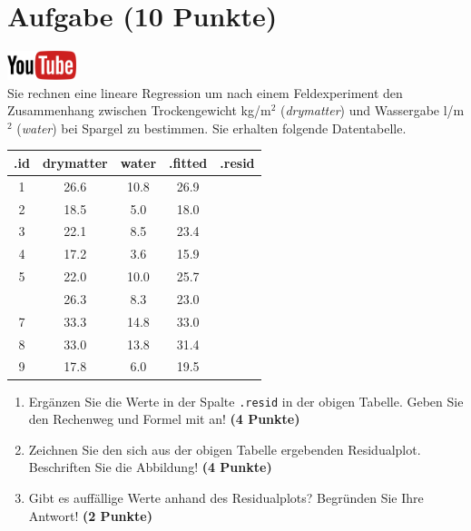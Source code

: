 \documentclass[a4paper, 10pt]{scrartcl}\usepackage[]{graphicx}\usepackage[]{xcolor}
\newenvironment{knitrout}{}{} %
\begin{document}
 
\clearpage

\section{Aufgabe \hfill (10 Punkte)}

\hfill\href{https://youtu.be/dyQlYV9nOqY}{\includegraphics[width =
  2cm]{img/youtube}}\\[1Ex]

Sie rechnen eine lineare Regression um nach einem Feldexperiment den
Zusammenhang zwischen Trockengewicht kg/m$^2$ (\textit{drymatter}) und
Wassergabe l/m$^2$ (\textit{water}) bei Spargel zu bestimmen. Sie erhalten
folgende Datentabelle.

\begin{knitrout}
\color{fgcolor}\begin{table}[!h]
\centering\begingroup\fontsize{12}{14}\selectfont

\begin{tabular}{ccccc}
\toprule
.id & drymatter & water & .fitted & .resid\\
\midrule
1 & 26.6 & 10.8 & 26.9 & \\
2 & 18.5 & 5.0 & 18.0 & \\
3 & 22.1 & 8.5 & 23.4 & \\
4 & 17.2 & 3.6 & 15.9 & \\
5 & 22.0 & 10.0 & 25.7 & \\
\addlinespace
6 & 26.3 & 8.3 & 23.0 & \\
7 & 33.3 & 14.8 & 33.0 & \\
8 & 33.0 & 13.8 & 31.4 & \\
9 & 17.8 & 6.0 & 19.5 & \\
\bottomrule
\end{tabular}
\endgroup{}
\end{table}

\end{knitrout}

\begin{enumerate}
\item Erg{\"a}nzen Sie die Werte in der Spalte \texttt{.resid} in der obigen
  Tabelle. Geben Sie den Rechenweg und Formel mit an! \textbf{(4 Punkte)}
\item Zeichnen Sie den sich aus der obigen Tabelle ergebenden
  Residualplot. Beschriften Sie die Abbildung! \textbf{(4 Punkte)}
\item Gibt es auff{\"a}llige Werte anhand des Residualplots? Begr{\"u}nden Sie Ihre
  Antwort! \textbf{(2 Punkte)}
\end{enumerate}
 
\end{document}
